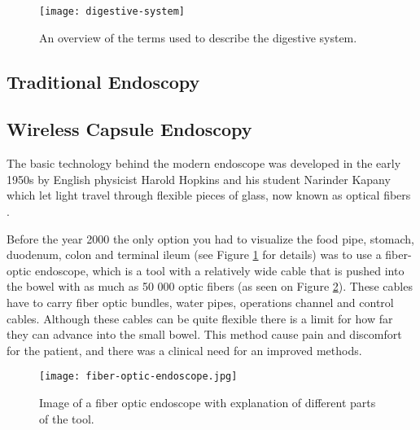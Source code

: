 \documentclass[thesis.tex]{subfiles}
\begin{document}
\begin{figure}[ht] %
  \begin{center}
    \texttt{[image: digestive-system]}
    \caption[An overview of the terms used to describe the digestive system]{An overview of the terms used to describe the digestive system\footnotemark.}
    \label{fig:digestive_system}
  \end{center}
\end{figure}



\subsection{Traditional Endoscopy}

\subsection{Wireless Capsule Endoscopy}  \label{wireless_capsule_endoscopy}
The basic technology behind the modern endoscope was developed in the early 1950s by English physicist Harold Hopkins and his student Narinder Kapany which let light travel through flexible pieces of glass, now known as optical fibers \cite{NewMethod54}.

Before the year 2000 the only option you had to visualize the food pipe, stomach, duodenum, colon and terminal ileum (see Figure \ref{fig:digestive_system} for details) was to use a fiber-optic endoscope, which is a tool with a relatively wide cable that is pushed into the bowel with as much as 50 000 optic fibers (as seen on Figure \ref{fig:fiber-optic-endoscopy}). These cables have to carry fiber optic bundles, water pipes, operations channel and control cables. Although these cables can be quite flexible there is a limit for how far they can advance into the small bowel. This method cause pain and discomfort for the patient, and there was a clinical need for an improved methods.

\begin{figure} %
  \begin{center}
    \texttt{[image: fiber-optic-endoscope.jpg]}
    \caption[Image of a fiber optic endoscope with explanation of different parts of the tool]{Image of a fiber optic endoscope with explanation of different parts of the tool\footnotemark.}
    \label{fig:fiber-optic-endoscopy}
  \end{center}
\end{figure}
\end{document}
